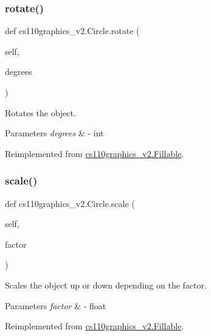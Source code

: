 \subsubsection{\texorpdfstring{rotate()}{rotate()}}
{\footnotesize\ttfamily def cs110graphics\+\_\+v2.\+Circle.\+rotate (\begin{DoxyParamCaption}\item[{}]{self,  }\item[{}]{degrees }\end{DoxyParamCaption})}



Rotates the object. 


\begin{DoxyParams}{Parameters}
{\em degrees} & -\/ int \\
\hline
\end{DoxyParams}


Reimplemented from \mbox{\hyperlink{classcs110graphics__v2_1_1Fillable_aee03142975056e9f3cbd5b7b5f81bcb7}{cs110graphics\+\_\+v2.\+Fillable}}.

\mbox{\label{classcs110graphics__v2_1_1Circle_a4a04c8a0ec27e30f3fd5af5fe428423b}} 
\subsubsection{\texorpdfstring{scale()}{scale()}}
{\footnotesize\ttfamily def cs110graphics\+\_\+v2.\+Circle.\+scale (\begin{DoxyParamCaption}\item[{}]{self,  }\item[{}]{factor }\end{DoxyParamCaption})}



Scales the object up or down depending on the factor. 


\begin{DoxyParams}{Parameters}
{\em factor} & -\/ float \\
\hline
\end{DoxyParams}


Reimplemented from \mbox{\hyperlink{classcs110graphics__v2_1_1Fillable_af023a8511e9e9149214a3bf8e3a50aae}{cs110graphics\+\_\+v2.\+Fillable}}.

\mbox{\label{classcs110graphics__v2_1_1Circle_a6aeb2c3a3c3a77d1b4b6fa3ad62a114a}} 
